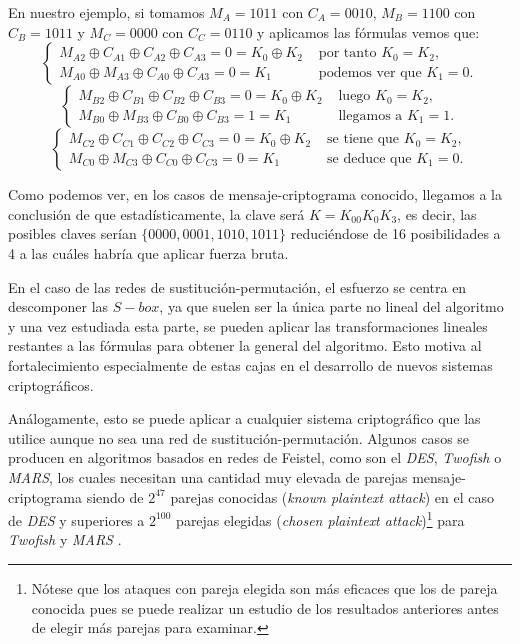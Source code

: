 En nuestro ejemplo, si tomamos $M_A=1011$ con $C_A=0010$, $M_B=1100$ con $C_B=1011$ y $M_C=0000$ con $C_C=0110$ y aplicamos las fórmulas vemos que:
$$\begin{cases}
	M_{A2} \oplus C_{A1} \oplus C_{A2} \oplus C_{A3} = 0 = K_0 \oplus K_2 & \text{ por tanto } K_0 = K_2, \\
	M_{A0} \oplus M_{A3} \oplus C_{A0} \oplus C_{A3} = 0 = K_1 & \text{ podemos ver que  } K_1 = 0.
\end{cases}$$
$$\begin{cases}
	M_{B2} \oplus C_{B1} \oplus C_{B2} \oplus C_{B3} = 0 = K_0 \oplus K_2 & \text{ luego } K_0 = K_2, \\
	M_{B0} \oplus M_{B3} \oplus C_{B0} \oplus C_{B3} = 1 = K_1 & \text{ llegamos a } K_1 = 1.
\end{cases}$$
$$\begin{cases}
	M_{C2} \oplus C_{C1} \oplus C_{C2} \oplus C_{C3} = 0 = K_0 \oplus K_2 & \text{ se tiene que } K_0 = K_2, \\
	M_{C0} \oplus M_{C3} \oplus C_{C0} \oplus C_{C3} = 0 = K_1 & \text{ se deduce que } K_1 = 0.
\end{cases}$$

Como podemos ver, en los casos de mensaje-criptograma conocido, llegamos a la conclusión de que estadísticamente, la clave será $K = K_00K_0K_3$, es decir, las posibles claves serían $\{0000, 0001, 1010, 1011\}$ reduciéndose de 16 posibilidades a 4 a las cuáles habría que aplicar fuerza bruta.

En el caso de las redes de sustitución-permutación, el esfuerzo se centra en descomponer las $S-box$, ya que suelen ser la única parte no lineal del algoritmo y una vez estudiada esta parte, se pueden aplicar las transformaciones lineales restantes a las fórmulas para obtener la general del algoritmo. Esto motiva al fortalecimiento especialmente de estas cajas en el desarrollo de nuevos sistemas criptográficos.

Análogamente, esto se puede aplicar a cualquier sistema criptográfico que las utilice aunque no sea una red de sustitución-permutación. Algunos casos se producen en algoritmos basados en redes de Feistel, como son el \textit{DES}, \textit{Twofish} o \textit{MARS}, los cuales necesitan una cantidad muy elevada de parejas mensaje-criptograma siendo de $2^{47}$ parejas conocidas (\textit{known plaintext attack}) en el caso de \textit{DES} y superiores a $2^{100}$ parejas elegidas (\textit{chosen plaintext attack})\footnote{Nótese que los ataques con pareja elegida son más eficaces que los de pareja conocida pues se puede realizar un estudio de los resultados anteriores antes de elegir más parejas para examinar.} para \textit{Twofish} y \textit{MARS} \cite{DES_Lin, Twofish_attack}.

